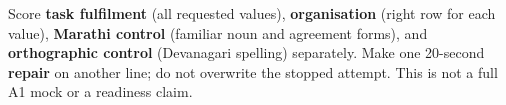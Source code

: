 \begin{tcolorbox}[breakable,colback=teal!4,colframe=teal!35!black,title={Before you move on}]
Score \textbf{task fulfilment} (all requested values), \textbf{organisation} (right row for each value), \textbf{Marathi control} (familiar noun and agreement forms), and \textbf{orthographic control} (Devanagari spelling) separately. Make one 20-second \textbf{repair} on another line; do not overwrite the stopped attempt. This is not a full A1 mock or a readiness claim.
\end{tcolorbox}
